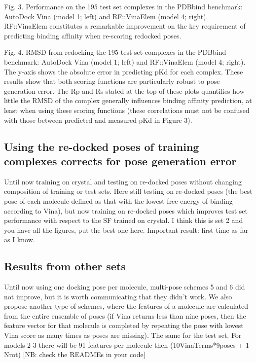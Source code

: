 \documentclass[twocolumn]{bmcart}
\begin{document}
Fig. 3. Performance on the 195 test set complexes in the PDBbind benchmark: AutoDock Vina (model 1; left) and RF::VinaElem (model 4; right). RF::VinaElem constitutes a remarkable improvement on the key requirement of predicting binding affinity when re-scoring redocked poses.

Fig. 4. RMSD from redocking the 195 test set complexes in the PDBbind benchmark: AutoDock Vina (model 1; left) and RF::VinaElem (model 4; right). The y-axis shows the absolute error in predicting pKd for each complex. These results show that both scoring functions are particularly robust to pose generation error. The Rp and Rs stated at the top of these plots quantifies how little the RMSD of the complex generally influences binding affinity prediction, at least when using these scoring functions (these correlations must not be confused with those between predicted and measured pKd in Figure 3).

\subsection*{Using the re-docked poses of training complexes corrects for pose generation error}

Until now training on crystal and testing on re-docked poses without changing composition of training or test sets. Here still testing on re-docked poses (the best pose of each molecule defined as that with the lowest free energy of binding according to Vina), but now training on re-docked poses which improves test set performance with respect to the SF trained on crystal. I think this is set 2 and you have all the figures, put the best one here. Important result: first time as far as I know.

\subsection*{Results from other sets}

Until now using one docking pose per molecule, multi-pose schemes 5 and 6 did not improve, but it is worth communicating that they didn’t work. We also propose another type of schemes, where the features of a molecule are calculated from the entire ensemble of poses (if Vina returns less than nine poses, then the feature vector for that molecule is completed by repeating the pose with lowest Vina score as many times as poses are missing). The same for the test set. For models 2-3 there will be 91 features per molecule then (10VinaTerms*9poses + 1 Nrot) [NB: check the READMEs in your code]
\end{document}
